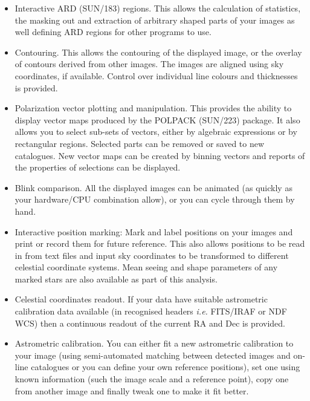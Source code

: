 \documentclass[twoside,11pt]{article}
\newcommand{\xref}[3]{#1}
\renewcommand{\_}{\texttt{\symbol{95}}}
\begin{document}
\begin{itemize}
\item Interactive ARD (\xref{SUN/183}{sun183}{}) regions. This
  allows the calculation of statistics, the masking out and
  extraction of arbitrary shaped parts of your images as well
  defining ARD regions for other programs to use.

\item Contouring. This allows the contouring of the displayed image,
 or the overlay of contours derived from other images. The images are
 aligned using sky coordinates, if available. Control over individual
 line colours and thicknesses is provided.

\item Polarization vector plotting and manipulation. This provides the
 ability to display vector maps produced by the POLPACK
 (\xref{SUN/223}{sun223}{}) package. It also allows you to select
 sub-sets of vectors, either by algebraic expressions or by rectangular
 regions. Selected parts can be removed or saved to new catalogues. New
 vector maps can be created by binning vectors and reports of the
 properties of selections can be displayed.

\item Blink comparison. All the displayed images can be animated
  (as quickly as your hardware/CPU combination allow), or
  you can cycle through them by hand.

\item Interactive position marking: Mark and label positions on your
  images and print or record them for future reference. This also
  allows positions to be read in from text files and input sky
  coordinates to be transformed to different celestial coordinate
  systems. Mean seeing and shape parameters of any marked stars are
  also available as part of this analysis.

\item Celestial coordinates readout. If your data have suitable
  astrometric calibration data available (in recognised headers
  \textit{i.e.} FITS/IRAF or NDF WCS) then a continuous readout of the
  current RA and Dec is provided.

\item Astrometric calibration. You can either fit a new astrometric
  calibration to your image (using semi-automated matching between detected
  images and on-line catalogues or you can define your own reference
  positions), set one using known information (such the image scale and a
  reference point), copy one from another image and finally tweak one to make
  it fit better.


\end{itemize}
\end{document}
